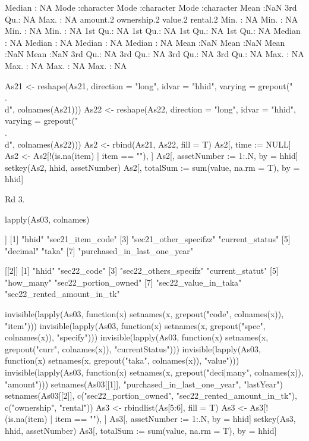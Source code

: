 \begin{Schunk}
\begin{Soutput}
 Median : NA   Mode  :character   Mode  :character   Mode  :character  
 Mean   :NaN                                                           
 3rd Qu.: NA                                                           
 Max.   : NA                                                           
    amount.2    ownership.2     value.2       rental.2  
 Min.   : NA   Min.   : NA   Min.   : NA   Min.   : NA  
 1st Qu.: NA   1st Qu.: NA   1st Qu.: NA   1st Qu.: NA  
 Median : NA   Median : NA   Median : NA   Median : NA  
 Mean   :NaN   Mean   :NaN   Mean   :NaN   Mean   :NaN  
 3rd Qu.: NA   3rd Qu.: NA   3rd Qu.: NA   3rd Qu.: NA  
 Max.   : NA   Max.   : NA   Max.   : NA   Max.   : NA  
\end{Soutput}
\begin{Sinput}
As21 <- reshape(As21, direction = "long", idvar = "hhid",
	varying = grepout("\\.\\d", colnames(As21)))
As22 <- reshape(As22, direction = "long", idvar = "hhid",
	varying = grepout("\\.\\d", colnames(As22)))
As2 <- rbind(As21, As22, fill = T)
As2[, time := NULL]
As2 <- As2[!(is.na(item) | item == ""), ]
As2[, assetNumber := 1:.N, by = hhid]
setkey(As2, hhid, assetNumber)
As2[, totalSum := sum(value, na.rm = T), by = hhid]
\end{Sinput}
\end{Schunk}
Rd 3.
\begin{Schunk}
\begin{Sinput}
lapply(As03, colnames)
\end{Sinput}
\begin{Soutput}
[[1]]
[1] "hhid"                       "sec21_item_code"           
[3] "sec21_other_specifzz"       "current_status"            
[5] "decimal"                    "taka"                      
[7] "purchased_in_last_one_year"

[[2]]
[1] "hhid"                      "sec22_code"               
[3] "sec22_others_specifz"      "current_statut"           
[5] "how_many"                  "sec22_portion_owned"      
[7] "sec22_value_in_taka"       "sec22_rented_amount_in_tk"
\end{Soutput}
\begin{Sinput}
invisible(lapply(As03, function(x) setnames(x, grepout("code", colnames(x)), "item")))
invisible(lapply(As03, function(x) setnames(x, grepout("spec", colnames(x)), "specify")))
invisible(lapply(As03, function(x) setnames(x, grepout("curr", colnames(x)), "currentStatus")))
invisible(lapply(As03, function(x) setnames(x, grepout("taka", colnames(x)), "value")))
invisible(lapply(As03, function(x) setnames(x, grepout("deci|many", colnames(x)), "amount")))
setnames(As03[[1]], "purchased_in_last_one_year", "lastYear")
setnames(As03[[2]], c("sec22_portion_owned", "sec22_rented_amount_in_tk"), 
	c("ownership", "rental"))
As3 <- rbindlist(As[5:6], fill = T)
As3 <- As3[!(is.na(item) | item == ""), ]
As3[, assetNumber := 1:.N, by = hhid]
setkey(As3, hhid, assetNumber)
As3[, totalSum := sum(value, na.rm = T), by = hhid]
\end{Sinput}
\end{Schunk}
